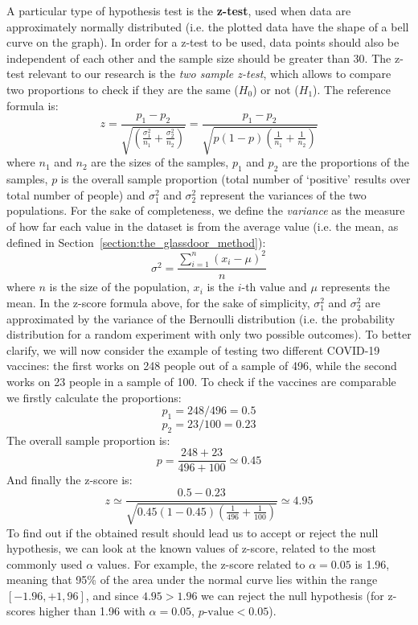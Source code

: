 A particular type of hypothesis test is the \textbf{z-test}, used when data are approximately normally distributed (i.e. the plotted data have the shape of a bell curve on the graph). In order for a z-test to be used, data points should also be independent of each other and the sample size should be greater than 30. The z-test relevant to our research is the \textit{two sample z-test}, which allows to compare two proportions to check if they are the same (\(H_0\)) or not (\(H_1\)). The reference formula is: \[z = \frac{p_1 - p_2}{\sqrt{(\frac{\sigma_1^2}{n_1} + \frac{\sigma_2^2}{n_2})}} = \frac{p_1 - p_2}{\sqrt{p(1 - p)(\frac{1}{n_1} + \frac{1}{n_2})}}\] where \(n_1\) and \(n_2\) are the sizes of the samples, \(p_1\) and \(p_2\) are the proportions of the samples, \(p\) is the overall sample proportion (total number of `positive' results over total number of people) and \(\sigma_1^2\) and \(\sigma_2^2\) represent the variances of the two populations. For the sake of completeness, we define the \textit{variance} as the measure of how far each value in the dataset is from the average value (i.e. the mean, as defined in Section~\ref{section:the_glassdoor_method}): \[\sigma^2 = \frac{\sum\limits_{i=1}^n (x_i - \mu)^2}{n}\] where \(n\) is the size of the population, \(x_i\) is the \(i\)-th value and \(\mu\) represents the mean. In the z-score formula above, for the sake of simplicity, \(\sigma_1^2\) and \(\sigma_2^2\) are approximated by the variance of the Bernoulli distribution (i.e. the probability distribution for a random experiment with only two possible outcomes). To better clarify, we will now consider the example of testing two different COVID-19 vaccines: the first works on 248 people out of a sample of 496, while the second works on 23 people in a sample of 100. To check if the vaccines are comparable we firstly calculate the proportions: \[p_1 = 248 / 496 = 0.5\] \[p_2 = 23 / 100 = 0.23\]
The overall sample proportion is: \[p = \frac{248 + 23}{496 + 100} \simeq 0.45\]
And finally the z-score is: \[z \simeq \frac{0.5 - 0.23}{\sqrt{0.45(1 - 0.45)(\frac{1}{496} + \frac{1}{100})}} \simeq 4.95\]
To find out if the obtained result should lead us to accept or reject the null hypothesis, we can look at the known values of z-score, related to the most commonly used \(\alpha\) values. For example, the z-score related to \(\alpha = 0.05\) is 1.96, meaning that 95\% of the area under the normal curve lies within the range \([-1.96, +1,96]\), and since \(4.95 > 1.96\) we can reject the null hypothesis (for z-scores higher than 1.96 with \(\alpha = 0.05\), \(p\textrm{-value} < 0.05\)).
